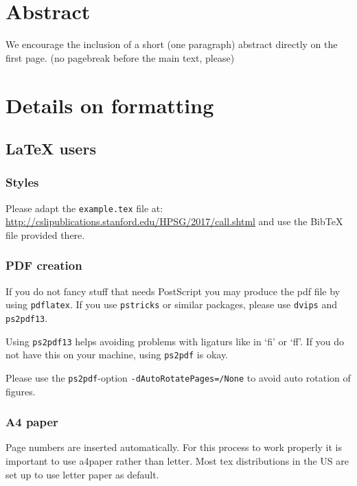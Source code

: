 \documentclass[11pt,a4paper,fleqn]{article}
\begin{document}
\section{Abstract}

We encourage the inclusion of a short (one paragraph)  abstract directly on the first page.
(no pagebreak before the main text, please)


\section{Details on formatting}

\subsection{\LaTeX{} users}

\subsubsection{Styles}

Please adapt the \verb+example.tex+ file at:\newline
\url{http://cslipublications.stanford.edu/HPSG/2017/call.shtml}\newline
and use the BibTeX file provided there.

\subsubsection{PDF creation}

If you do not fancy stuff that needs PostScript you may produce
the pdf file by using \verb+pdflatex+. If you use \verb+pstricks+ or
similar packages, please use \verb+dvips+ and \verb+ps2pdf13+.

Using \verb+ps2pdf13+ helps avoiding problems with ligaturs like in `fi'
or `ff'. If you do not have this on your machine, using \verb+ps2pdf+ is okay.

Please use the \verb+ps2pdf+-option \verb+-dAutoRotatePages=/None+  to avoid auto rotation
of figures.


\subsubsection{A4 paper}

Page numbers are inserted automatically. For this process to work properly it is important to use
a4paper rather than letter. Most tex distributions in the US are set up to use letter paper as default.
\end{document}

